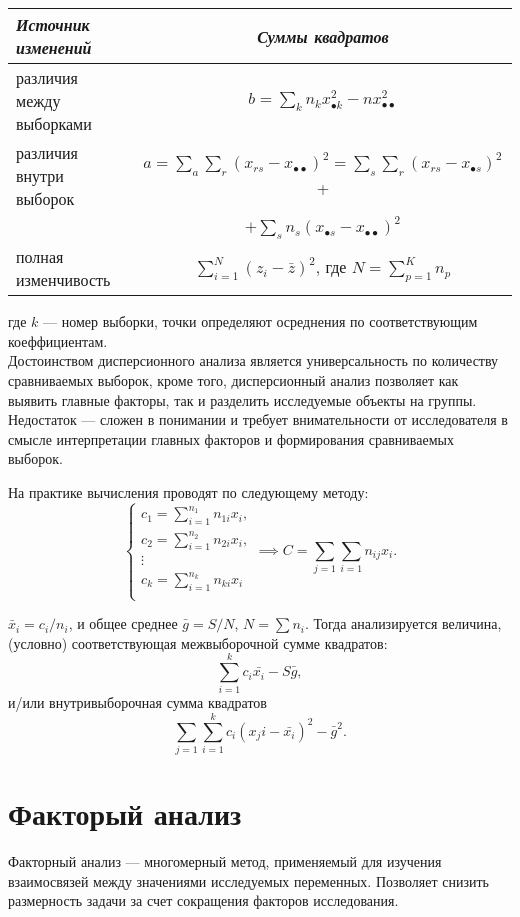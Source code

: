 \documentclass[12pt]{article}
\begin{document}
\begin{center}
\bgroup
\def\arraystretch{2.5}
\begin{tabular}{|l|c|}
        \hline
	    \textit{Источник изменений} & \textit{Суммы квадратов}\\
        \hline
	    различия между выборками & $b = \sum\limits_k n_k x_{\bullet k}^2 - nx_{\bullet \bullet}^2 $\\
	    различия внутри выборок & $a = \sum\limits_a \sum\limits_r (x_{rs} - x_{\bullet \bullet} )^2 = \sum\limits_s \sum\limits_r (x_{rs} - x_{\bullet s})^2 $ +\\
	     & $+ \sum\limits_s n_s (x_{\bullet s} - x_{\bullet \bullet} )^2$\\
        полная изменчивость & $\sum\limits_{i=1}^N (z_i - \bar{z})^2$, где $N = \sum\limits_{p=1}^K n_p$\\
        \hline
\end{tabular}
\egroup
\end{center}

где $k$ --- номер выборки, точки определяют осреднения по соответствующим коеффициентам.\\

Достоинством дисперсионного анализа является универсальность по количеству сравниваемых выборок, кроме того, дисперсионный анализ позволяет как выявить главные факторы, так и разделить исследуемые объекты на группы. Недостаток --- сложен в понимании и требует внимательности от исследователя в смысле интерпретации главных факторов и формирования сравниваемых выборок.

На практике вычисления проводят по следующему методу:
\[
\begin{cases}
    c_1 = \sum_{i=1}^{n_1} n_{1i} x_i,\\
    c_2 = \sum_{i=1}^{n_2} n_{2i} x_i,\\
    \vdots\\
    c_k = \sum_{i=1}^{n_k} n_{ki} x_i\\ 
\end{cases}
\implies C = \sum_{j=1}\sum_{i=1}n_{ij} x_i.
\]

$\bar{x}_i = c_i / n_i$, и общее среднее $\bar{g} = S / N$, $N = \sum n_i$. Тогда анализируется величина, (условно) соответствующая межвыборочной сумме квадратов:
\[ \sum_{i=1}^k c_i \bar{x_i} - S\bar{g}, \]
и/или внутривыборочная сумма квадратов
\[ \sum_{j=1}\sum_{i=1}^k c_i (x_ji - \bar{x_i})^2 - \bar{g}^2. \] 

\newpage
\section{Факторый анализ}
Факторный анализ --- многомерный метод, применяемый для изучения взаимосвязей между значениями исследуемых переменных. Позволяет снизить размерность задачи за счет сокращения факторов исследования.
\end{document}
